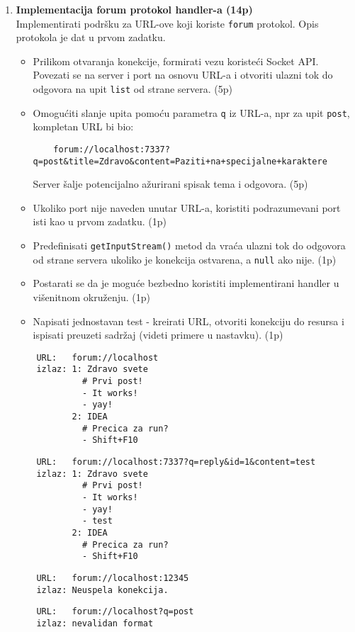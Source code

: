 \documentclass[]{article}
\begin{document}
\begin{enumerate}
\vspace{15pt}

\item \textbf{Implementacija forum protokol handler-a (14p)}
\\Implementirati podr\v{s}ku za URL-ove koji koriste \texttt{forum} protokol. Opis protokola je dat u prvom zadatku. 
\begin{itemize}
  \item Prilikom otvaranja konekcije, formirati vezu koriste\'c{}i Socket API. Povezati se na server i port na osnovu URL-a i otvoriti ulazni tok do odgovora na upit \texttt{list} od strane servera. \hfill (5p)
  \item Omogu\'c{}iti slanje upita pomo\'c{}u parametra \texttt{q} iz URL-a, npr za upit \texttt{post}, kompletan URL bi bio:
  \begin{lstlisting}
    forum://localhost:7337?q=post&title=Zdravo&content=Paziti+na+specijalne+karaktere
  \end{lstlisting}
  Server \v{s}alje potencijalno a\v{z}urirani spisak tema i odgovora. \hfill (5p)
  \item Ukoliko port nije naveden unutar URL-a, koristiti podrazumevani port isti kao u prvom zadatku. \hfill (1p)
  \item Predefinisati \texttt{getInputStream()} metod da vra\'c{}a ulazni tok do odgovora od strane servera ukoliko je konekcija ostvarena, a \texttt{null} ako nije. \hfill (1p)
  \item Postarati se da je mogu\'c{}e bezbedno koristiti implementirani handler u vi\v{s}enitnom okru\v{z}enju. \hfill (1p)
  \item Napisati jednostavan test - kreirati URL, otvoriti konekciju do resursa i ispisati preuzeti sadr\v{z}aj (videti primere u nastavku). \hfill (1p)
\end{itemize}

\vspace{10pt}
\noindent
  \begin{lstlisting}
    URL:   forum://localhost
    izlaz: 1: Zdravo svete
             # Prvi post!
             - It works!
             - yay!
           2: IDEA
             # Precica za run?
             - Shift+F10
  \end{lstlisting}
  \begin{lstlisting}
    URL:   forum://localhost:7337?q=reply&id=1&content=test
    izlaz: 1: Zdravo svete
             # Prvi post!
             - It works!
             - yay!
             - test
           2: IDEA
             # Precica za run?
             - Shift+F10
  \end{lstlisting}
  \begin{lstlisting}
    URL:   forum://localhost:12345
    izlaz: Neuspela konekcija.
  \end{lstlisting}
  \begin{lstlisting}
    URL:   forum://localhost?q=post
    izlaz: nevalidan format
  \end{lstlisting}
\end{enumerate}
\end{document}
